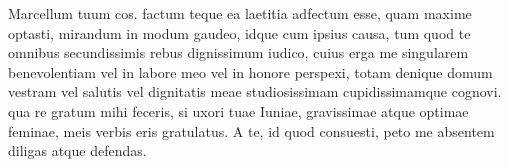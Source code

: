 


 Marcellum tuum cos. factum teque ea laetitia adfectum esse, quam maxime optasti, mirandum in modum gaudeo, idque cum ipsius causa, tum quod te omnibus secundissimis rebus dignissimum iudico, cuius erga me singularem benevolentiam vel in labore meo vel in honore perspexi, totam denique domum vestram vel salutis vel dignitatis meae studiosissimam cupidissimamque cognovi. qua re gratum mihi feceris, si uxori tuae Iuniae, gravissimae atque optimae feminae, meis verbis eris gratulatus. A te, id quod consuesti, peto me absentem diligas atque defendas.
